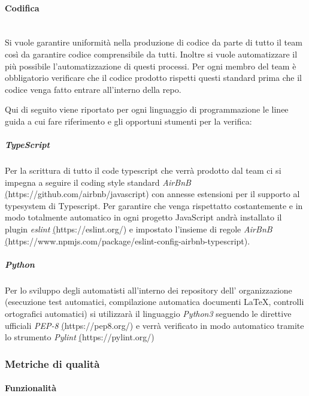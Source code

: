\paragraph{Codifica}
\mbox{} \\
Si vuole garantire uniformità nella produzione di codice da parte di tutto il team così da garantire codice comprensibile
da tutti.
Inoltre si vuole automatizzare il più possibile l'automatizzazione di questi processi.
Per ogni membro del team è obbligatorio verificare che il codice prodotto rispetti questi standard prima che il codice
venga fatto entrare all'interno della repo.

Qui di seguito viene riportato per ogni linguaggio di programmazione le linee guida a cui fare riferimento e gli opportuni
stumenti per la verifica:

\subparagraph{TypeScript}
Per la scrittura di tutto il code typescript che verrà prodotto dal team ci si impegna a seguire il coding
style standard \textit{AirBnB} \href{https://github.com/airbnb/javascript}(https://github.com/airbnb/javascript)
con annesse estensioni per il supporto al typesystem di Typescript.
Per garantire che venga rispettatto costantemente e in modo totalmente automatico in ogni progetto JavaScript
andrà installato il plugin \textit{eslint} \href{https://eslint.org/}(https://eslint.org/) e impostato l'insieme
di regole \textit{AirBnB} \href{https://www.npmjs.com/package/eslint-config-airbnb-typescript}
(https://www.npmjs.com/package/eslint-config-airbnb-typescript).

\subparagraph{Python}
Per lo sviluppo degli automatisti all'interno dei repository dell' organizzazione (esecuzione test automatici,
compilazione automatica documenti \LaTeX, controlli ortografici automatici) si utilizzarà il linguaggio \textit{Python3}
seguendo le direttive ufficiali \textit{PEP-8} \href{https://pep8.org/}(https://pep8.org/) e verrà verificato in modo
automatico tramite lo strumento \textit{Pylint} \href{https://pylint.org/}(https://pylint.org/)

\newpage
\subsubsection{Metriche di qualità}
\paragraph{Funzionalità}
\mbox{}\\
\setlength\extrarowheight{5pt}


